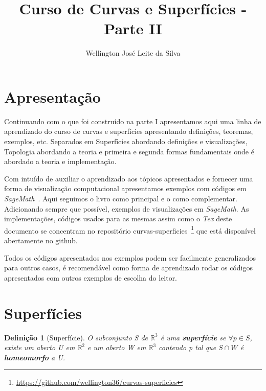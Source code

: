 \documentclass[12pt]{article}
\title{Curso de Curvas e Superfícies - Parte II}
\author{Wellington José Leite da Silva\inst{1}}
\date{}
\newtheorem{definition}{Definição}
\newcommand{\furl}[1]{\footnote{\url{#1}}}
\begin{document}
\maketitle

\section*{Apresentação}
Continuando com o que foi construído na parte I apresentamos aqui uma linha de aprendizado do curso de curvas e superfícies apresentando definições, teoremas, exemplos, etc. Separados em Superfícies abordando definições e visualizações, Topologia abordando a teoria e primeira e segunda formas fundamentais onde é abordado a teoria e implementação.

Com intuído de auxiliar o aprendizado aos tópicos apresentados e fornecer uma forma de visualização computacional apresentamos exemplos com códigos em \textit{SageMath}~\cite{sagemath}. Aqui seguimos o livro \cite{bookmain} como principal e o \cite{manfredo} como complementar. Adicionando sempre que possível, exemplos de visualizações em \textit{SageMath}. As implementações, códigos usados para as mesmas assim como o \textit{Tex} deste documento se concentram no repositório curvas-superficies~\furl{https://github.com/wellington36/curvas-superficies} que está disponível abertamente no github.

Todos os códigos apresentados nos exemplos podem ser facilmente generalizados para outros casos, é recomendável como forma de aprendizado rodar os códigos apresentados com outros exemplos de escolha do leitor.

\section{Superfícies}
\begin{definition}[Superfície]
O subconjunto S de $\mathbb{R}^3$ é uma \textbf{superfície} se $\forall p \in S$, existe um aberto U em $\mathbb{R}^2$ e um aberto W em $\mathbb{R}^3$ contendo p tal que $S \cap W$ é \textbf{homeomorfo} a U.
\end{definition}
\end{document}
